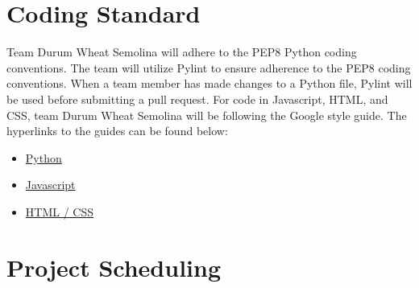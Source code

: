 \documentclass{article}
\begin{document}
\section{Coding Standard}
Team Durum Wheat Semolina will adhere to the PEP8 Python coding conventions. The team will utilize Pylint to ensure adherence to the PEP8 coding conventions. When a team member has made changes to a Python file, Pylint will be used before submitting a pull request. For code in Javascript, HTML, and CSS, team Durum Wheat Semolina will be following the Google style guide. The hyperlinks to the guides can be found below:
\begin{itemize}
	\item \href{https://peps.python.org/pep-0008/}{Python}
	\item \href{https://google.github.io/styleguide/jsguide.html}{Javascript}
	\item \href{https://google.github.io/styleguide/htmlcssguide.html}{HTML / CSS}
\end{itemize}

\section{Project Scheduling}

\end{document}
